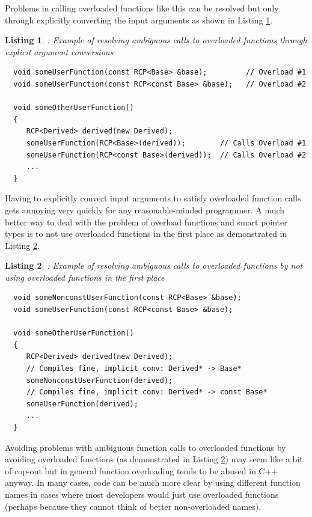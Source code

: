 \documentclass[pdf,ps2pdf,11pt]{SANDreport}
\newtheorem{listing}{Listing}
\begin{document}
Problems in calling overloaded functions like this can be resolved but
only through explicitly converting the input arguments as shown in
Listing {}\ref{listing:overloaded-func-implicit-conv-explicit-pass}.


{}\begin{listing}: Example of resolving ambiguous calls to overloaded
functions through explicit argument conversions
\label{listing:overloaded-func-implicit-conv-explicit-pass}
{\small\begin{verbatim}
  void someUserFunction(const RCP<Base> &base);         // Overload #1
  void someUserFunction(const RCP<const Base> &base);   // Overload #2

  void someOtherUserFunction()
  {
     RCP<Derived> derived(new Derived);
     someUserFunction(RCP<Base>(derived));        // Calls Overload #1
     someUserFunction(RCP<const Base>(derived));  // Calls Overload #2
     ...
  }
\end{verbatim}}
\end{listing}


Having to explicitly convert input arguments to satisfy overloaded
function calls gets annoying very quickly for any reasonable-minded
programmer.  A much better way to deal with the problem of overload
functions and smart pointer types is to not use overloaded functions in
the first place as demonstrated in Listing
{}\ref{listing:overloaded-func-implicit-conv-nonoverload}.


{}\begin{listing}: Example of resolving ambiguous calls to overloaded
functions by not using overloaded functions in the first place
\label{listing:overloaded-func-implicit-conv-nonoverload}
{\small\begin{verbatim}
  void someNonconstUserFunction(const RCP<Base> &base);
  void someUserFunction(const RCP<const Base> &base);

  void someOtherUserFunction()
  {
     RCP<Derived> derived(new Derived);
     // Compiles fine, implicit conv: Derived* -> Base*
     someNonconstUserFunction(derived);
     // Compiles fine, implicit conv: Derived* -> const Base*
     someUserFunction(derived);
     ...
  }
\end{verbatim}}
\end{listing}


Avoiding problems with ambiguous function calls to overloaded
functions by avoiding overloaded functions (as demonstrated in Listing
{}\ref{listing:overloaded-func-implicit-conv-nonoverload}) may seem
like a bit of cop-out but in general function overloading tends to be
abused in C++ anyway.  In many cases, code can be much more clear by
using different function names in cases where most developers would
just use overloaded functions (perhaps because they cannot think of
better non-overloaded names).
\end{document}
